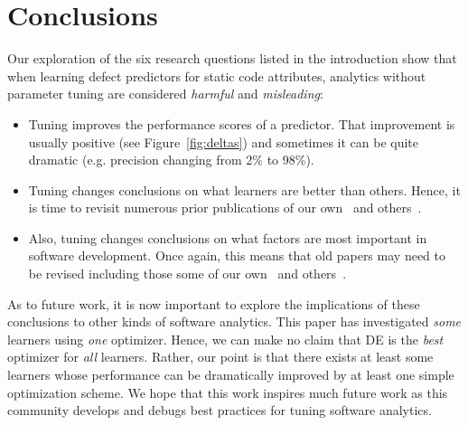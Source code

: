 \documentclass{sig-alternative}
\newcommand{\bi}{\begin{itemize}[leftmargin=0.4cm]}
\newcommand{\ei}{\end{itemize}}
\newcommand{\fig}[1]{Figure~\ref{fig:#1}}
\begin{document}







\section{Conclusions}


Our exploration of the six research
questions listed in the introduction
show that when learning defect predictors for static code
attributes,   analytics without parameter tuning are considered {\em harmful} and {\em misleading}:
\bi
\item Tuning improves the performance scores of a predictor.
That improvement is usually positive (see \fig{deltas}) and sometimes
it can be quite   dramatic (e.g. precision changing from 2\% to 98\%). \item 
Tuning changes conclusions on what learners are better than others.
Hence, it is time to revisit numerous prior publications of our own~\cite{me07b}
and others~\cite{lessmann2008benchmarking,hall11}.
\item
Also,
tuning changes conclusions on what factors are most important in software development.
Once again, this means that old papers may need to be revised including those
some of our own~\cite{me02k} and others~\cite{bell2013limited,rahman2013how,Moser:2008,zimmermann2007predicting,herzig2013predicting}. 
\ei
As to future work, it is now important
to explore the implications of these
conclusions to other kinds of software analytics.
 This paper has investigated  {\em some} learners using {\em one}  optimizer. Hence, we can make
no claim that DE is the {\em best} optimizer for {\em all} learners.
Rather, our point is that there exists at least some learners
whose performance can be dramatically improved by 
at least one simple optimization scheme.  We hope that this work inspires
much future work as this community develops and debugs best practices for tuning
software analytics.
\end{document}
